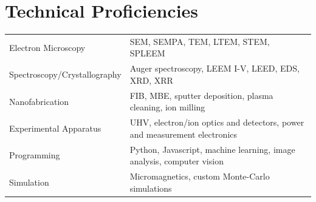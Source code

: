 \documentclass[a4paper,12pt]{article}
\begin{document}
\section{Technical Proficiencies}
\begin{tabularx}{\linewidth}{@{}l X@{}}
Electron Microscopy &  \normalsize{SEM, SEMPA, TEM, LTEM, STEM, SPLEEM}\\
Spectroscopy/Crystallography &  \normalsize{Auger spectroscopy, LEEM I-V, LEED, EDS, XRD, XRR}\\
Nanofabrication &  \normalsize{FIB, MBE, sputter deposition, plasma cleaning, ion milling}\\
Experimental Apparatus &  \normalsize{UHV, electron/ion optics and detectors, power and measurement electronics}\\
Programming &  \normalsize{Python, Javascript, machine learning, image analysis, computer vision}\\
Simulation & \normalsize{Micromagnetics, custom Monte-Carlo simulations}
\end{tabularx}

\vfill
{}
\end{document}
